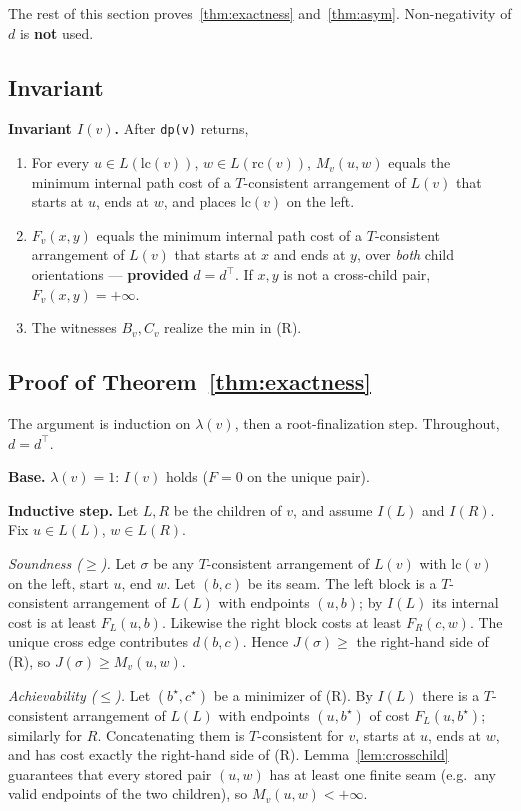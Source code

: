 \documentclass[11pt]{article}
\theoremstyle{plain}
\newcommand{\lc}{\mathrm{lc}}
\newcommand{\rc}{\mathrm{rc}}
\begin{document}
The rest of this section proves~\ref{thm:exactness} and~\ref{thm:asym}.
Non-negativity of \(d\) is \textbf{not} used.

\subsection{Invariant}

\textbf{Invariant \(I(v)\).} After \texttt{dp(v)} returns,

\begin{enumerate}[label=\arabic*.]
\item For every \(u \in L(\lc(v))\), \(w \in L(\rc(v))\), \(M_v(u,w)\) equals
  the minimum internal path cost of a \(T\)-consistent arrangement of \(L(v)\)
  that starts at \(u\), ends at \(w\), and places \(\lc(v)\) on the left.
\item \(F_v(x,y)\) equals the minimum internal path cost of a \(T\)-consistent
  arrangement of \(L(v)\) that starts at \(x\) and ends at \(y\), over
  \emph{both} child orientations --- \textbf{provided} \(d = d^\top\). If
  \(x,y\) is not a cross-child pair, \(F_v(x,y) = +\infty\).
\item The witnesses \(B_v, C_v\) realize the min in (R).
\end{enumerate}

\subsection{Proof of Theorem~\ref{thm:exactness}}

The argument is induction on \(\lambda(v)\), then a root-finalization step.
Throughout, \(d = d^\top\).

\textbf{Base.} \(\lambda(v)=1\): \(I(v)\) holds (\(F=0\) on the unique pair).

\textbf{Inductive step.} Let \(L,R\) be the children of \(v\), and assume
\(I(L)\) and \(I(R)\). Fix \(u \in L(L)\), \(w \in L(R)\).

\emph{Soundness (\(\ge\)).} Let \(\sigma\) be any \(T\)-consistent arrangement
of \(L(v)\) with \(\lc(v)\) on the left, start \(u\), end \(w\). Let \((b,c)\)
be its seam. The left block is a \(T\)-consistent arrangement of \(L(L)\) with
endpoints \((u,b)\); by \(I(L)\) its internal cost is at least \(F_L(u,b)\).
Likewise the right block costs at least \(F_R(c,w)\). The unique cross edge
contributes \(d(b,c)\). Hence \(J(\sigma) \ge\) the right-hand side of (R), so
\(J(\sigma) \ge M_v(u,w)\).

\emph{Achievability (\(\le\)).} Let \((b^\star,c^\star)\) be a minimizer of (R).
By \(I(L)\) there is a \(T\)-consistent arrangement of \(L(L)\) with endpoints
\((u,b^\star)\) of cost \(F_L(u,b^\star)\); similarly for \(R\). Concatenating
them is \(T\)-consistent for \(v\), starts at \(u\), ends at \(w\), and has cost
exactly the right-hand side of (R). Lemma~\ref{lem:crosschild} guarantees that
every stored pair \((u,w)\) has at least one finite seam (e.g.\ any valid
endpoints of the two children), so \(M_v(u,w) < +\infty\).
\end{document}
